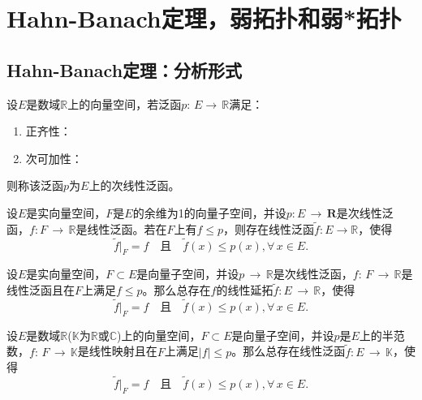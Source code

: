 \section{Hahn-Banach定理，弱拓扑和弱*拓扑}
\subsection{Hahn-Banach定理：分析形式}

\begin{definition}[次线性泛函]
	设$E$是数域$\mathbb{R}$上的向量空间，若泛函$p:\, E\rightarrow \, \mathbb{R}$满足：
	\begin{enumerate}
		\item 正齐性：
		\item 次可加性：
	\end{enumerate}
	则称该泛函$p$为$E$上的次线性泛函。
\end{definition}

\begin{lemma}
	设$E$是实向量空间，$F$是$E$的余维为1的向量子空间，并设$p:E\, \rightarrow \, \mathbf{R}$是次线性泛函，$f:F\, \rightarrow \, \mathbb{R} $是线性泛函。若在$F$上有$f \leq p $，则存在线性泛函$\tilde{f}:E\rightarrow \mathbb{R} $，使得
	\begin{equation*}
		\tilde{f}\big|_{F}=f\quad \text{且} \quad \tilde{f}(x)\leq p(x),\forall \, x\in E.
	\end{equation*}
\end{lemma}

\begin{theorem}
	设$E$是实向量空间，$F\subset E $是向量子空间，并设$p\, \rightarrow \, \mathbb{R} $是次线性泛函，$f:\, F\, \rightarrow \, \mathbb{R} $是线性泛函且在$F$上满足$f\leq p$。那么总存在$f$的线性延拓$\tilde{f}: E\, \rightarrow \, \mathbb{R} $，使得
	\begin{equation*}
		\tilde{f}\big|_{F}=f\quad \text{且} \quad \tilde{f}(x)\leq p(x),\forall \, x\in E.
	\end{equation*}
\end{theorem}

\begin{theorem}
	设$E$是数域$\mathbb{R}$($\mathbb{K}$为$\mathbb{R}$或$\mathbb{C}$)上的向量空间，$F\subset E $是向量子空间，并设$p$是$E$上的半范数，$f:\, F\, \rightarrow \, \mathbb{K} $是线性映射且在$F$上满足$|f|\leq p$。那么总存在线性泛函$\tilde{f}:E\,\rightarrow \, \mathbb{K} $，使得
	\begin{equation*}
		\tilde{f}\big|_{F}=f\quad \text{且} \quad \tilde{f}(x)\leq p(x),\forall \, x\in E.
	\end{equation*}
\end{theorem}

